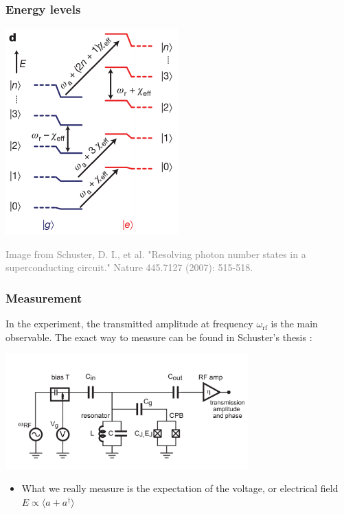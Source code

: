 \documentclass[xcolor=dvipsnames,hyperref={CJKbookmarks=true}]{beamer}
\newcommand{\rf}{\text{rf}}
\begin{document}
\begin{frame}[t]\frametitle{Energy levels}
\begin{center}
	\includegraphics[width=0.5\linewidth]{energy_levels.pdf}
\end{center}
\tiny{\textcolor{gray}{Image from Schuster, D. I., et al. "Resolving photon number states in a superconducting circuit." Nature 445.7127 (2007): 515-518.\cite{schuster2007resolving}}}
\end{frame}

\begin{frame}[t]\frametitle{Measurement}
In the experiment, the transmitted amplitude at frequency $\omega_{\rf}$ is the 
main observable. The exact way to measure can be found in Schuster's thesis \cite{schuster2007circuit}: 
\begin{center}
  \includegraphics[width=0.7\textwidth]{measurement.png}
\end{center}
	\begin{itemize}
		\item What we really measure is the expectation of the voltage, or 
		electrical field $E\propto\langle a + a^\dag \rangle$
	\end{itemize}
\end{frame}
\end{document}
